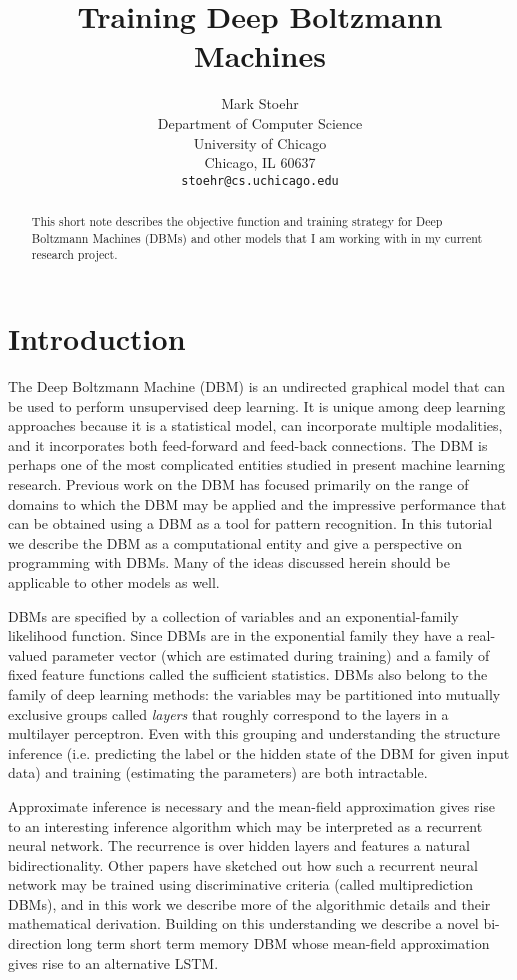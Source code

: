 \documentclass{article} %
\title{Training Deep Boltzmann Machines}
\author{
Mark Stoehr %
\\
Department of Computer Science\\
University of Chicago\\
Chicago, IL 60637 \\
\texttt{stoehr@cs.uchicago.edu} \\
}
\begin{document}
\maketitle

\begin{abstract}
This short note describes the objective function and training strategy for Deep Boltzmann Machines (DBMs)
and other models that I am working with in my current research project.
\end{abstract}

\section{Introduction}

The Deep Boltzmann Machine (DBM) is an undirected graphical model that
can be used to perform unsupervised deep learning. It is unique among deep learning approaches
because it is a statistical model, can incorporate multiple modalities, and it incorporates both feed-forward
and feed-back connections. The DBM is perhaps one of the most complicated
entities studied in present machine learning research.  Previous work on the DBM has focused primarily on the
range of domains to which the DBM may be applied and the impressive performance that can be obtained using a DBM
as a tool for pattern recognition.  In this tutorial we describe the DBM as a computational entity and give
a perspective on programming with DBMs.  Many of the ideas discussed herein should be applicable to other models as well.

DBMs are specified by a collection of variables and an
exponential-family likelihood function.  Since DBMs are in the
exponential family they have a real-valued parameter vector (which are
estimated during training) and a family of fixed feature functions
called the sufficient statistics.  DBMs also belong to the family of
deep learning methods: the variables may be partitioned into mutually
exclusive groups called {\it layers} that roughly correspond to the
layers in a multilayer perceptron. Even with this grouping and
understanding the structure inference (i.e. predicting the label or
the hidden state of the DBM for given input data) and training (estimating the parameters) are both intractable.

Approximate inference is necessary and the mean-field approximation gives rise to an interesting inference algorithm
which may be interpreted as a recurrent neural network.  The recurrence is over hidden layers and features a natural
bidirectionality.  Other papers have sketched out how such a recurrent neural network may be trained using discriminative
criteria (called multiprediction DBMs), and in this work we describe more of the algorithmic details and their
mathematical derivation.  Building on this understanding we describe a novel bi-direction long term short term memory
DBM whose mean-field approximation gives rise to an alternative LSTM.
\end{document}
